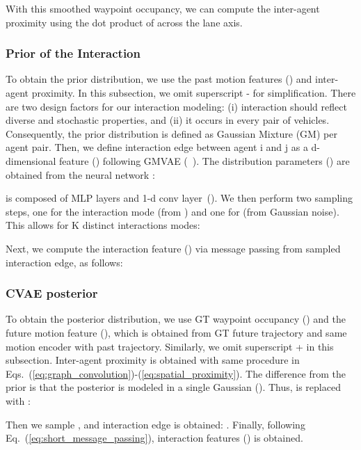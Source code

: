 \documentclass{article} \usepackage{iclr2023_conference,times}
\begin{document}
With this smoothed waypoint occupancy, we can compute the inter-agent proximity using the dot product of  across the lane axis.


\subsubsection{Prior of the Interaction}
\label{sec:prior}
To obtain the prior distribution, we use the past motion features () and inter-agent proximity.
In this subsection, we omit superscript - for simplification.
There are two design factors for our interaction modeling: (i) interaction should reflect diverse and stochastic properties, and (ii) it occurs in every pair of vehicles.
Consequently, the prior distribution is defined as Gaussian Mixture (GM) per agent pair.
Then, we define interaction edge  between agent i and j as a d-dimensional feature () following GMVAE (~\cite{dilokthanakul2016deep}). 
The distribution parameters () are obtained from the neural network :

 is composed of MLP layers and 1-d conv layer~(\cite{deo2018convolutional}).
We then perform two sampling steps, one for the interaction mode  (from ) and one for  (from Gaussian noise).
This allows for K distinct interactions modes:


Next, we compute the interaction feature () via message passing from sampled interaction edge, as follows:
\vspace{-2pt}


\subsubsection{CVAE posterior}
\label{sec:posterior}
To obtain the posterior distribution, we use GT waypoint occupancy () and the future motion feature (), which is obtained from GT future trajectory and same motion encoder with past trajectory.
Similarly, we omit superscript + in this subsection.
Inter-agent proximity is obtained with same procedure in Eqs.~(\ref{eq:graph_convolution})-(\ref{eq:spatial_proximity}).
The difference from the prior is that the posterior is modeled in a single Gaussian ().
Thus,  is replaced with :

Then we sample , and interaction edge is obtained: .
Finally, following Eq.~(\ref{eq:short_message_passing}), interaction features () is obtained.
\end{document}
